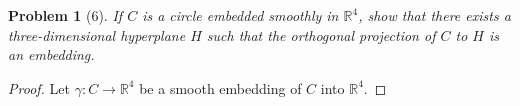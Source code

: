 \documentclass[10pt]{article}
\newcommand{\sk}{\vskip 10mm}
\newcommand{\bb}[1]{\mathbb{#1}}
\theoremstyle{plain}
\newtheorem{problem}{Problem}
\theoremstyle{remark}
\begin{document}
\sk

\begin{problem}[6]
  If $C$ is a circle embedded smoothly in $\bb{R}^4$, show that
  there exists a three-dimensional hyperplane $H$ such that the
  orthogonal projection of $C$ to $H$ is an embedding.
\end{problem}

\begin{proof}
  Let $\gamma:C\rightarrow\bb{R}^4$ be a smooth embedding of $C$ into $\bb{R}^4$.
\end{proof}

\sk

\end{document}
